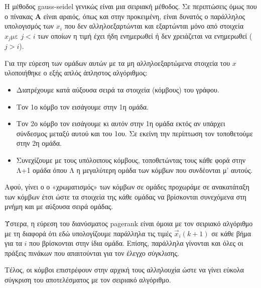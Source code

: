 Η μέθοδος gauss-seidel γενικώς είναι μια σειριακή μέθοδος. Σε περιπτώσεις όμως που ο πίνακας $\bm{A}$ είναι αραιός, όπως και στην προκειμένη, είναι δυνατός ο παράλληλος υπολογισμός των $x_i$ που δεν αλληλοεξαρτώνται και εξαρτώνται μόνο από στοιχεία $x_j\text{με } j < i$ των οποίων η τιμή έχει ήδη ενημερωθεί ή δεν χρειάζεται να ενημερωθεί ($j > i$).

Για την εύρεση των ομάδων αυτών με τα μη αλληλοεξαρτώμενα στοιχεία του $x$ υλοποιήθηκε ο εξής απλός άπληστος αλγόριθμος:

\begin{itemize}
\item Διατρέχουμε κατά αύξουσα σειρά τα στοιχεία (κόμβους) του γράφου.
\item Τον 1ο κόμβο τον εισάγουμε στην 1η ομάδα.
\item Tον 2ο κόμβο τον εισάγουμε κι αυτόν στην 1η ομάδα εκτός αν υπάρχει σύνδεσμος μεταξύ αυτού και του 1ου. Σε εκείνη την περίπτωση τον τοποθετούμε στην 2η ομάδα.
\item Συνεχίζουμε με τους υπόλοιπους κόμβους, τοποθετώντας τους κάθε φορά στην Λ+1 ομάδα όπου Λ η μεγαλύτερη ομάδα των κόμβων που συνδέονται μ' αυτούς.
\end{itemize}

Αφού, γίνει ο ο «χρωματισμός» των κόμβων σε ομάδες προχωράμε σε ανακατάταξη των κόμβων έτσι ώστε τα στοιχεία της κάθε ομάδας να βρίσκονται συνεχόμενα στη μνήμη και με αύξουσα σειρά ομάδας.

Ύστερα, η εύρεση του διανύσματος pagerank είναι όμοια με τον σειριακό αλγόριθμο με τη διαφορά ότι εδώ υπολογίζουμε παράλληλα τις τιμές $\vec{x}_i(k+1)$ σε κάθε βήμα για τα $i$ που βρίσκονται στην ίδια ομάδα. Επίσης, παράλληλα γίνονται και όλες οι πράξεις πινάκων που απαιτούνται για τον έλεγχο σύγκλισης.

Τέλος, οι κόμβοι επιστρέφουν στην αρχική τους αλληλουχία ώστε να γίνει εύκολα σύγκριση του αποτελέσματος με τον σειριακό αλγόριθμο.

